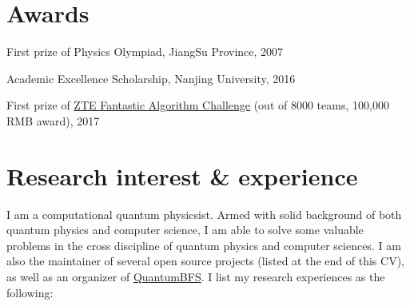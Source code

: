 \documentclass[letterpaper]{article}
\renewenvironment{itemize}{
  \begin{list}{}{
    \setlength{\leftmargin}{1.5em}
  }
}{
  \end{list}
}
\begin{document}
\section*{Awards}
\begin{itemize}
    \item First prize of Physics Olympiad, JiangSu Province, 2007
    \item Academic Excellence Scholarship, Nanjing University, 2016
    \item First prize of \href{http://www.iqiyi.com/w\_19rto3v4h1.html}{ZTE Fantastic Algorithm Challenge} (out of 8000 teams, 100,000 RMB award), 2017
\end{itemize}

\section*{Research interest \& experience}
I am a computational quantum physicsist. Armed with solid background of both quantum physics and computer science, I am able to solve some valuable problems in the cross discipline of quantum physics and computer sciences.
I am also the maintainer of several open source projects (listed at the end of this CV), as well as an organizer of \href{https://github.com/QuantumBFS/}{QuantumBFS}.
I list my research experiences as the following:
\end{document}
